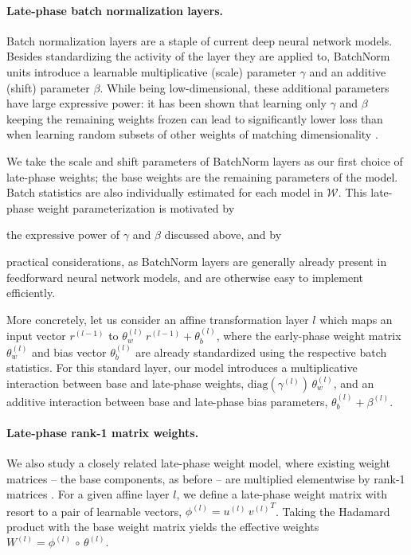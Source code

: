 \documentclass{article} \usepackage{iclr2021_conference,times}
\begin{document}
\paragraph{Late-phase batch normalization layers.} Batch normalization layers \citep[BatchNorm;][]{ioffe_batch_2015} are a staple of current deep neural network models. Besides standardizing the activity of the layer they are applied to, BatchNorm units introduce a learnable multiplicative (scale) parameter $\gamma$ and an additive (shift) parameter $\beta$. While being low-dimensional, these additional parameters have large expressive power: it has been shown that learning only $\gamma$ and $\beta$ keeping the remaining weights frozen can lead to significantly lower loss than when learning random subsets of other weights of matching dimensionality \citep[][]{frankle_training_2020,mudrakarta_k_2019}.


We take the scale and shift parameters of BatchNorm layers as our first choice of late-phase weights; the base weights are the remaining parameters of the model. Batch statistics are also individually estimated for each model in $\mathcal{W}$. This late-phase weight parameterization is motivated by
\begin{enumerate*}[label=(\itshape\roman*)]
  \item the expressive power of $\gamma$ and $\beta$ discussed above, and by
  \item practical considerations, as BatchNorm layers are generally already present in feedforward neural network models, and are otherwise easy to implement efficiently.
\end{enumerate*}

More concretely, let us consider an affine transformation layer $l$ which maps an input vector $r^{(l-1)}$ to $\theta_w^{(l)} \, r^{(l-1)} + \theta_b^{(l)}$, where the early-phase weight matrix $\theta_w^{(l)}$ and bias vector $\theta_b^{(l)}$ are already standardized using the respective batch statistics. For this standard layer, our model introduces a multiplicative interaction between base and late-phase weights, $\text{diag}(\gamma^{(l)}) \, \theta_w^{(l)}$, and an additive interaction between base and late-phase bias parameters, $\theta_b^{(l)} + \beta^{(l)}$.

\paragraph{Late-phase rank-1 matrix weights.} We also study a closely related late-phase weight model, where existing weight matrices -- the base components, as before -- are multiplied elementwise by rank-1 matrices \citep[][]{wen_batchensemble_2020}. For a given affine layer $l$, we define a late-phase weight matrix with resort to a pair of learnable vectors, $\phi^{(l)} = u^{(l)} \, {v^{(l)}}^T$. Taking the Hadamard product with the base weight matrix yields the effective weights $W^{(l)} = \phi^{(l)} \, \circ \, \theta^{(l)}$.
\end{document}
